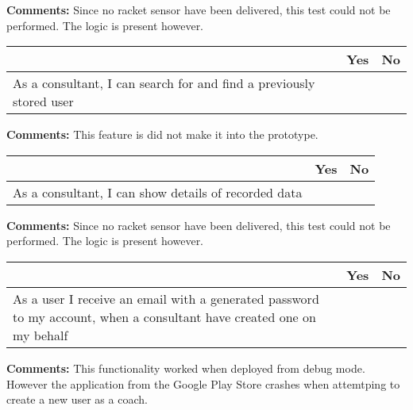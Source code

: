 \vspace{3mm}
\textbf{Comments:}
Since no racket sensor have been delivered, this test could not be performed. The logic is present however.
\vspace{3mm}


\begin{tabularx}{\textwidth}{|b|c|c|}
	\hline
	 & Yes & No \\
	\hline
	As a consultant, I can search for and find a previously stored user &   & \xmark  \\
	\hline
	\end{tabularx}

\vspace{3mm}
\textbf{Comments:}
This feature is did not make it into the prototype.
\vspace{3mm}


\begin{tabularx}{\textwidth}{|b|c|c|}
	\hline
	 & Yes & No \\
	\hline
	As a consultant, I can show details of recorded data &   & \xmark  \\
	\hline
	\end{tabularx}

\vspace{3mm}
\textbf{Comments:}
Since no racket sensor have been delivered, this test could not be performed. The logic is present however.
\vspace{3mm}


\begin{tabularx}{\textwidth}{|b|c|c|}
	\hline
	 & Yes & No \\
	\hline
	As a user I receive an email with a generated password to my account, when a consultant have created one on my behalf &  & \xmark  \\
	\hline
	\end{tabularx}

\vspace{3mm}
\textbf{Comments:}
This functionality worked when deployed from debug mode. However the application from the Google Play Store crashes when attemtping to create a new user as a coach.
\vspace{3mm}

